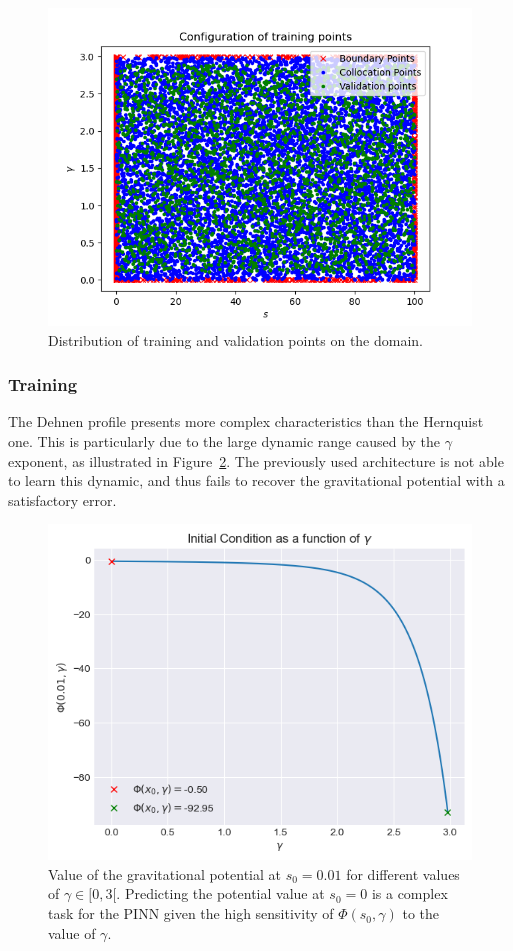 \begin{figure}
\centering
\includegraphics[width=\textwidth]{imgs/training-points-dehnen.png}
\caption{Distribution of training and validation points on the domain.}
\label{fig:training-points-dehnen}
\end{figure}

\subsubsection{Training}

The Dehnen profile presents more complex characteristics than the Hernquist one. This is particularly due to the large dynamic range caused by the $\gamma$ exponent, as illustrated in Figure~\ref{fig:gamma-vs-x0-dehnen}. The previously used architecture is not able to learn this dynamic, and thus fails to recover the gravitational potential with a satisfactory error.

\begin{figure}
\centering
\includegraphics[width=\textwidth]{imgs/gamma-vs-x0-dehnen.png}
\caption{Value of the gravitational potential at $s_0 = 0.01$ for different values of $\gamma \in [0, 3[$. Predicting the potential value at $s_0=0$ is a complex task for the PINN given the high sensitivity of $\Phi(s_0, \gamma)$ to the value of $\gamma$.}
\label{fig:gamma-vs-x0-dehnen}
\end{figure}

